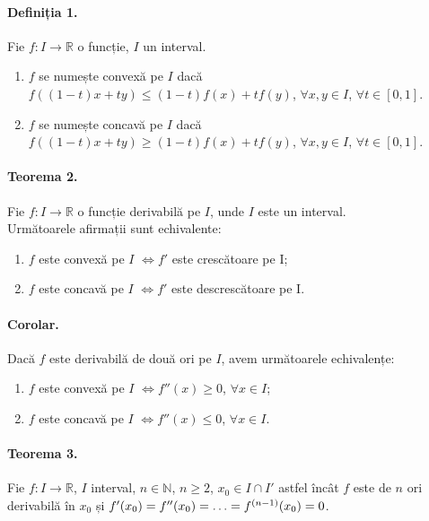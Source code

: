 \paragraph{Definiția 1.}
Fie $f: I \rightarrow \mathbb{R}$ o funcție, $I$ un interval.
\begin{enumerate}[label=\emph{\alph*})]
	\item $f$ se numește convexă pe $I$ dacă $f((1-t)x + ty) \leq (1-t)f(x) + tf(y)$, $\forall x, y \in I$, $\forall t \in [0, 1]$.
	\item $f$ se numește concavă pe $I$ dacă $f((1-t)x + ty) \geq (1-t)f(x) + tf(y)$, $\forall x, y \in I$, $\forall t \in [0, 1]$.
\end{enumerate}

\paragraph{Teorema 2.}
Fie $f:I \rightarrow \mathbb{R}$ o funcție derivabilă pe $I$, unde $I$ este un interval. \\
Următoarele afirmații sunt echivalente:

\begin{enumerate}[label=\emph{\alph*})]
	\item $f$ este convexă pe $I$ $\Leftrightarrow f'$ este crescătoare pe I;
	\item $f$ este concavă pe $I$ $\Leftrightarrow f'$ este descrescătoare pe I.
\end{enumerate}

\paragraph{Corolar.}
Dacă $f$ este derivabilă de două ori pe $I$, avem următoarele echivalențe:

\begin{enumerate}[label=\emph{\alph*})]
	\item $f$ este convexă pe $I$ $\Leftrightarrow f''(x) \geq 0$, $\forall x \in I$;
	\item $f$ este concavă pe $I$ $\Leftrightarrow f''(x) \leq 0$, $\forall x \in I$.
\end{enumerate}

\paragraph{Teorema 3.}
Fie $f:I \rightarrow \mathbb{R}$, $I$ interval, $n \in \mathbb{N}$, $n \geq 2$, $x_{0} \in I \cap I'$ astfel încât $f$ este de $n$ ori derivabilă în $x_{0}$ și
$f'(x_{0}) = f''(x_{0}) = \mathellipsis = f^{(n-1)}(x_{0}) = 0$.

